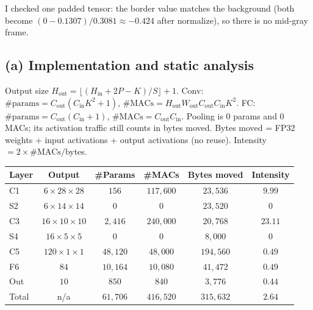 \documentclass[11pt]{article}
\begin{document}
I checked one padded tensor: the border value matches the background
(both become \((0-0.1307)/0.3081\approx -0.424\) after normalize), so
there is no mid-gray frame.

\subsection*{(a) Implementation and static analysis}

Output size \(H_{\mathrm{out}}=\lfloor(H_{\mathrm{in}}+2P-K)/S\rfloor+1\).
Conv: \(\#\mathrm{params}=C_{\mathrm{out}}(C_{\mathrm{in}}K^2+1)\),
\(\#\mathrm{MACs}=H_{\mathrm{out}}W_{\mathrm{out}}C_{\mathrm{out}}C_{\mathrm{in}}K^2\).
FC: \(\#\mathrm{params}=C_{\mathrm{out}}(C_{\mathrm{in}}+1)\),
\(\#\mathrm{MACs}=C_{\mathrm{out}}C_{\mathrm{in}}\).
Pooling is 0 params and 0 MACs; its activation traffic still counts in
bytes moved. Bytes moved = FP32 weights + input activations + output
activations (no reuse). Intensity \(=2\times\#\mathrm{MACs}/\)bytes.

\begin{center}
\footnotesize
\begin{tabular}{lccccc}
    \toprule
    Layer & Output & \#Params & \#MACs & Bytes moved & Intensity \\
    \midrule
    C1  & \(6\times28\times28\)   & \(156\)    & \(117{,}600\) & \(23{,}536\)  & \(9.99\) \\
    S2  & \(6\times14\times14\)   & \(0\)      & \(0\)         & \(23{,}520\)  & \(0\) \\
    C3  & \(16\times10\times10\)  & \(2{,}416\)& \(240{,}000\) & \(20{,}768\)  & \(23.11\) \\
    S4  & \(16\times5\times5\)    & \(0\)      & \(0\)         & \(8{,}000\)   & \(0\) \\
    C5  & \(120\times1\times1\)   & \(48{,}120\)& \(48{,}000\) & \(194{,}560\) & \(0.49\) \\
    F6  & \(84\)                  & \(10{,}164\)& \(10{,}080\) & \(41{,}472\)  & \(0.49\) \\
    Out & \(10\)                  & \(850\)    & \(840\)       & \(3{,}776\)   & \(0.44\) \\
    \midrule
    Total & n/a & \(61{,}706\) & \(416{,}520\) & \(315{,}632\) & \(2.64\) \\
    \bottomrule
\end{tabular}
\end{center}
\end{document}
